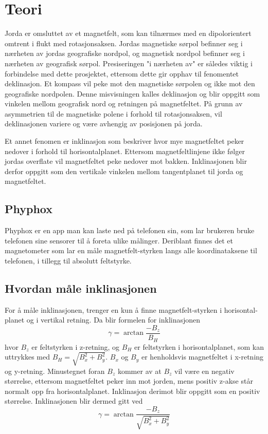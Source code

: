 \section{Teori}
Jorda er omsluttet av et magnetfelt, som kan tilnærmes med en 
dipolorientert omtrent i flukt med rotasjonsaksen. Jordas magnetiske sørpol 
befinner seg i nærheten av jordas geografiske nordpol, og magnetisk nordpol 
befinner seg i nærheten av geografisk sørpol. Presiseringen "i nærheten av" 
er således viktig i forbindelse med dette prosjektet, ettersom dette gir 
opphav til fenomentet deklinasjon. Et kompass vil peke mot den magnetiske sørpolen og ikke mot den geografiske nordpolen.
Denne misvisningen kalles deklinasjon og blir oppgitt som vinkelen mellom 
geografisk nord og retningen på magnetfeltet. På grunn av asymmetrien til 
de magnetiske polene i forhold til rotasjonsaksen, vil deklinasjonen 
variere og være avhengig av posisjonen på jorda. \cite{World_magnetic_model}

Et annet fenomen er inklinasjon som beskriver hvor mye magnetfeltet peker 
nedover i forhold til horisontalplanet. Ettersom magnetfeltlinjene ikke følger jordas overflate vil 
magnetfeltet peke nedover mot bakken. Inklinasjonen 
blir derfor oppgitt som den vertikale vinkelen mellom tangentplanet til jorda og
magnetfeltet.

\subsection{Phyphox}
Phyphox er en app man kan laste ned på telefonen sin, som lar brukeren 
bruke telefonen sine sensorer til å foreta ulike målinger. Deriblant finnes 
det et magnetometer som lar en måle magnetfelt-styrken langs alle 
koordinataksene til telefonen, i tillegg til absolutt feltstyrke. 
\cite{phyphox}

\subsection{Hvordan måle inklinasjonen}
For å måle inklinasjonen, trenger en kun å finne magnetfelt-styrken i horisontal-
planet og i vertikal retning. Da blir formelen for inklinasjonen 
\begin{equation}
    \gamma = \arctan \frac{-B_z}{B_H} 
\end{equation}
hvor $B_z$ er feltstyrken i z-retning, og $B_H$ er feltstyrken i horisontalplanet, som kan 
uttrykkes med $B_H = \sqrt{B_x^2 + B_y^2}$. $B_x$ og $B_y$ er henholdsvis magnetfeltet i x-retning
og y-retning.
Minustegnet foran $B_z$ kommer av at $B_z$ vil være en negativ størrelse, ettersom magnetfeltet peker inn mot 
jorden, mens 
positiv z-akse står normalt opp fra horisontalplanet. Inklinasjon derimot blir oppgitt 
som en positiv størrelse.
Inklinasjonen blir dermed gitt ved
\begin{equation}
    \label{eq:inclination}
    \gamma = \arctan{ \frac{-B_z}{\sqrt{B_x^2 + B_y^2}} }
\end{equation}

